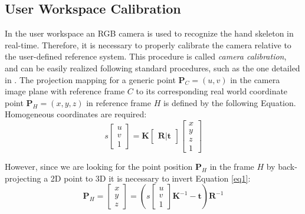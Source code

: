 \documentclass[a4paper, 10pt, conference]{ieeeconf}      %
\begin{document}
\subsection{User Workspace Calibration}
In the user workspace an RGB camera is used to recognize the hand skeleton in real-time. Therefore, it is necessary to properly calibrate the camera relative to the user-defined reference system. This procedure is called \textit{camera calibration}, and can be easily realized following standard procedures, such as the one detailed in \cite{MatlabCameraCalib}.
The projection mapping for a generic point $\mathbf{P}_{C} = (u,v)$ in the camera image plane with reference frame $C$ to its corresponding real world coordinate point $\mathbf{P}_{H} = (x,y,z)$ in reference frame $H$ is defined by the following Equation. Homogeneous coordinates are required:
\begin{equation}
s 
\begin{bmatrix}
u \\
v \\
1
\end{bmatrix}
=
\mathbf{K}
\begin{bmatrix}
\mathbf{R} | \mathbf{t}
\end{bmatrix}
\begin{bmatrix}
x \\
y \\
z \\
1
\end{bmatrix}
\label{eq1}
\end{equation}

However, since we are looking for the point position $\mathbf{P}_H$ in the frame $H$ by back-projecting a 2D point to 3D it is necessary to invert Equation \ref{eq1}:
\begin{equation}
\mathbf{P}_{H} = \begin{bmatrix}
x \\
y \\
z
\end{bmatrix}=
\left(s 
\begin{bmatrix}
u \\
v \\
1
\end{bmatrix}
\mathbf{K}^{-1}-\mathbf{t}\right)\mathbf{R}^{-1}
\label{eq2}
\end{equation}
\end{document}
